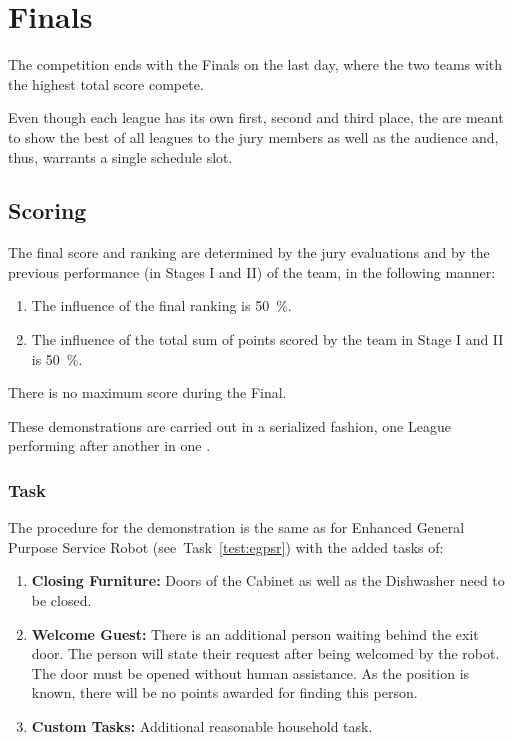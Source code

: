 \chapter{Finals}

The competition ends with the Finals on the last day, where the two teams with the highest total score compete.

Even though each league has its own first, second and third place, the  are meant to show the best of all leagues to the jury members as well as the audience and, thus, warrants a single schedule slot.

\section{Scoring}
The final score and ranking are determined by the jury evaluations and by the previous performance (in Stages I and II) of the team, in the following manner:

\begin{enumerate}
  \item The influence of the final ranking is \SI{50}{\percent}.
  \item The influence of the total sum of points scored by the team in Stage I and II is \SI{50}{\percent}.
\end{enumerate}

There is no maximum score during the Final.

These demonstrations are carried out in a serialized fashion, one League performing after another in one \Arena{}.

\subsection{Task}
The procedure for the demonstration is the same as for Enhanced General Purpose Service Robot (see~Task~\ref{test:egpsr}) with the added tasks of:

\begin{enumerate}[nosep]
  \item \textbf{Closing Furniture:} Doors of the Cabinet as well as the Dishwasher need to be closed.
  \item \textbf{Welcome Guest:} There is an additional person waiting behind the exit door. The person will state their request after being welcomed by the robot. The door must be opened without human assistance. As the position is known, there will be no points awarded for finding this person.
  \item \textbf{Custom Tasks:} Additional reasonable household task.
\end{enumerate}

